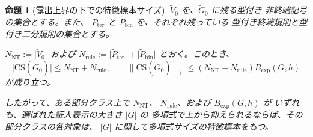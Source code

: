 \documentclass[11pt,a4paper]{ltjsarticle}
\newtheorem{proposition}[theorem]{命題}
\theoremstyle{remark}
\newcommand{\CS}{\mathrm{CS}}
\begin{document}
\begin{proposition}[露出上界の下での特徴標本サイズ]
\label{prop:cs-exposure-bound}
\(\widetilde{V}_0\) を、\(\widetilde{G}_0\) に残る型付き
非終端記号の集合とする。また、
\(\widetilde{P}_{\mathrm{ter}}\) と
\(\widetilde{P}_{\mathrm{bin}}\) を、それぞれ残っている
型付き終端規則と型付き二分規則の集合とする。

\(N_{\mathrm{NT}}:=\lvert\widetilde{V}_0\rvert\) および
\(N_{\mathrm{rule}}
:=\lvert\widetilde{P}_{\mathrm{ter}}\rvert
 +\lvert\widetilde{P}_{\mathrm{bin}}\rvert\)
とおく。このとき、
\[
  \lvert\CS(\widetilde{G}_0)\rvert
  \le N_{\mathrm{NT}}+N_{\mathrm{rule}},
  \qquad
  \lVert\CS(\widetilde{G}_0)\rVert_+
  \le
  (N_{\mathrm{NT}}+N_{\mathrm{rule}})
  B_{\mathrm{exp}}(G,h)
\]
が成り立つ。

したがって、ある部分クラス上で \(N_{\mathrm{NT}}\)、
\(N_{\mathrm{rule}}\)、および \(B_{\mathrm{exp}}(G,h)\) が
いずれも、選ばれた証人表示の大きさ \(\lvert G\rvert\) の
多項式で上から抑えられるならば、その部分クラスの各対象は、
\(\lvert G\rvert\) に関して多項式サイズの特徴標本をもつ。
\end{proposition}
\end{document}
